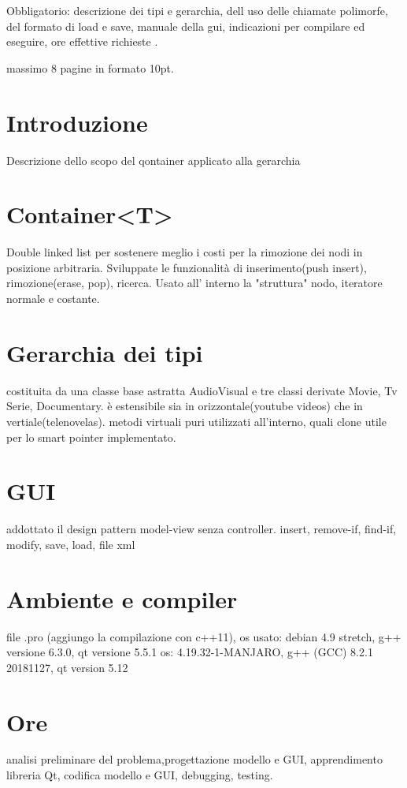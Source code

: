 


    Obbligatorio: descrizione dei tipi e gerarchia, dell uso delle chiamate polimorfe, del formato di load e save, manuale della gui, indicazioni per compilare ed eseguire, ore effettive richieste .

    massimo 8 pagine in formato 10pt.
    \section{Introduzione}
        Descrizione dello scopo del qontainer applicato alla gerarchia

    \section{Container<T>}
        Double linked list per sostenere meglio i costi per la rimozione dei nodi in posizione arbitraria. Sviluppate le funzionalità di inserimento(push insert), rimozione(erase, pop), ricerca. Usato all' interno la "struttura" nodo, iteratore normale e costante. 

    \section{Gerarchia dei tipi}
        
        costituita da una classe base astratta AudioVisual e tre classi derivate Movie, Tv Serie, Documentary. è estensibile sia in orizzontale(youtube videos) che in vertiale(telenovelas). metodi virtuali puri utilizzati all'interno, quali clone utile per lo smart pointer implementato. 

    \section{GUI}
        addottato il design pattern model-view senza controller. 
        insert, remove-if, find-if, modify, save, load, file xml

    \section{Ambiente e compiler}
        file .pro (aggiungo la compilazione con c++11), os usato: debian 4.9 stretch, g++ versione 6.3.0, qt versione 5.5.1
        os: 4.19.32-1-MANJARO, g++ (GCC) 8.2.1 20181127, qt version 5.12

    \section{Ore}
        analisi preliminare del problema,progettazione
        modello e GUI, apprendimento libreria Qt, codifica modello e GUI, debugging, testing.


